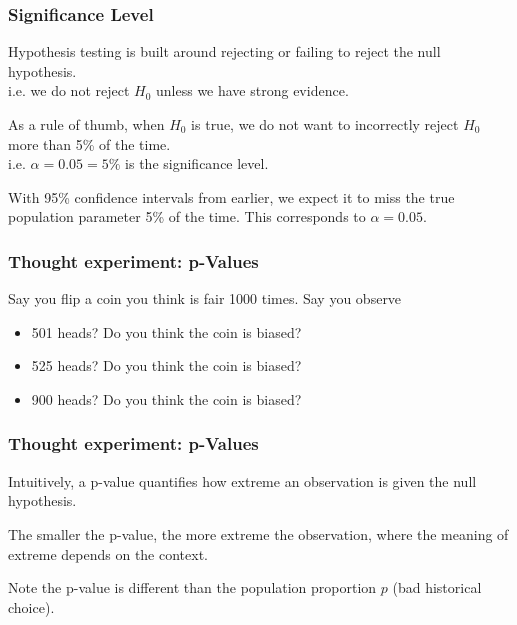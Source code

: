 \documentclass[handout]{beamer}
\newcommand{\blue}[1]{\textcolor{blue2}{#1}}
\begin{document}
\begin{frame}
\frametitle{Significance Level}

%
%
Hypothesis testing is built around rejecting or failing to reject the null hypothesis.\\
\pause i.e. we do not reject $H_0$ unless we have \blue{strong evidence}.

\pause \vspace{0.5cm}

As a rule of thumb, when $H_0$ is true, we do not want to incorrectly reject $H_0$ more than 5\% of the time.\\
i.e. $\alpha = 0.05 = 5\%$ is the \blue{significance level}.  

\pause \vspace{0.5cm}

With 95\% confidence intervals from earlier, we expect it to miss the true population parameter 5\% of the time.  This corresponds to $\alpha=0.05$.   
\end{frame}


\begin{frame}
\frametitle{Thought experiment: p-Values}
Say you flip a coin you think is fair 1000 times.  Say you observe
\begin{itemize}
\pause \item 501 heads? Do you think the coin is biased?
\pause \item 525 heads? Do you think the coin is biased?
\pause \item 900 heads? Do you think the coin is biased?
\end{itemize}

\end{frame}


\begin{frame}
\frametitle{Thought experiment: p-Values}

Intuitively, a \blue{p-value} quantifies how \blue{extreme} an observation is given the null hypothesis.  
  
\vskip 0.25cm

\pause The smaller the p-value, the more \blue{extreme} the observation, where the meaning of extreme depends on the context.  

\vskip 0.25cm

\pause Note the p-value is different than the population proportion $p$ (bad historical choice).

\end{frame}
\end{document}
